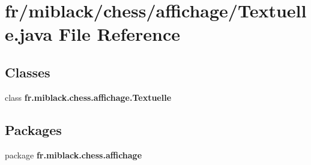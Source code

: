 \section{fr/miblack/chess/affichage/\-Textuelle.java File Reference}
\label{Textuelle_8java}
\subsection*{Classes}
\begin{DoxyCompactItemize}
\item 
class {\bf fr.\-miblack.\-chess.\-affichage.\-Textuelle}
\end{DoxyCompactItemize}
\subsection*{Packages}
\begin{DoxyCompactItemize}
\item 
package {\bf fr.\-miblack.\-chess.\-affichage}
\end{DoxyCompactItemize}

